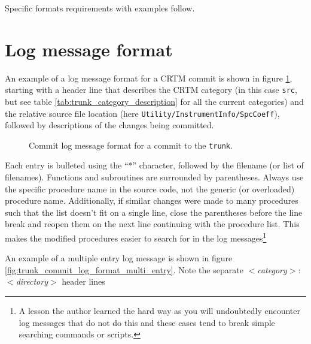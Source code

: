 Specific formats requirements with examples follow.


\section{Log message format}
An example of a log message format for a CRTM commit is shown in figure \ref{fig:trunk_commit_log_format}, starting with a header line that describes the CRTM category (in this case \texttt{src}, but see table \ref{tab:trunk_category_description} for all the current categories) and the relative source file location (here \texttt{Utility/InstrumentInfo/SpcCoeff}), followed by descriptions of the changes being committed.

\begin{figure}[htp]
  \centering
  \caption{Commit log message format for a commit to the \texttt{trunk}.}
  \label{fig:trunk_commit_log_format}
\end{figure}

Each entry is bulleted using the ``*'' character, followed by the filename (or list of filenames). Functions and subroutines are surrounded by parentheses. Always use the specific procedure name in the source code, not the generic (or overloaded) procedure name. Additionally, if similar changes were made to many procedures such that the list doesn't fit on a single line, close the parentheses before the line break and reopen them on the next line continuing with the procedure list. This makes the modified procedures easier to search for in the log messages\footnote{A lesson the author learned the hard way as you will undoubtedly encounter log messages that do not do this and these cases tend to break simple searching commands or scripts.}

An example of a multiple entry log message is shown in figure \ref{fig:trunk_commit_log_format_multi_entry}. Note the separate $<$\textit{category}$>$:$<$\textit{directory}$>$ header lines

